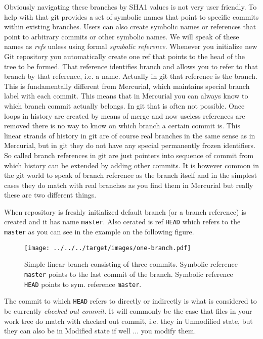 \documentclass{article}
\theoremstyle{definition}
\begin{document}
        Obviously navigating these branches by SHA1 values is not very user friendly. To help with that git provides a set
        of symbolic names that point to specific commits within existing branches. Users can also create symbolic names or
        references that point to arbitrary commits or other symbolic names. We will speak of these names as {\em refs}
        unless using formal {\em symbolic reference}. Whenever you initialize new Git repository you automatically create
        one ref that points to the head of the tree to be formed. That reference identifies branch and allows you to refer
        to that branch by that reference, i.e. a name. Actually in git that reference is the branch. This is fundamentally
        different from Mercurial, which maintains special branch label with each commit. This means that in Mercurial you
        can always know to which branch commit actually belongs. In git that is often not possible. Once loops in history
        are created by means of merge and now useless references are removed there is no way to know on which branch a
        certain commit is. This linear strands of history in git are of course real branches in the same sense as in
        Mercurial, but in git they do not have any special permanently frozen identifiers. So called branch references in
        git are just pointers into sequence of commit from which history can be extended by adding other commits. It is
        however common in the git world to speak of branch reference as the branch itself and in the simplest cases they do
        match with real branches as you find them in Mercurial but really these are two different things.

        When repository is freshly initialized default branch (or a branch reference) is created and it has name
        \texttt{master}. Also cerated is ref \texttt{HEAD} which refers to the \texttt{master} as you can see in the
        example on the following figure.

        \begin{figure}[h]
            \centering\texttt{[image: ../../../target/images/one-branch.pdf]}
            \caption{Simple linear branch consisting of three commits. Symbolic reference \texttt{master} points to the last
              commit of the branch. Symbolic reference \texttt{HEAD} points to sym. reference \texttt{master}.\label{fig:one-branch}}
        \end{figure}

        \noindent The commit to which \texttt{HEAD} refers to directly or indirectly is what is considered to be currently
        {\em checked out commit}. It will commonly be the case that files in your work tree do match with checked out
        commit, i.e. they in Unmodified state, but they can also be in Modified state if well ... you modify them.
\end{document}
